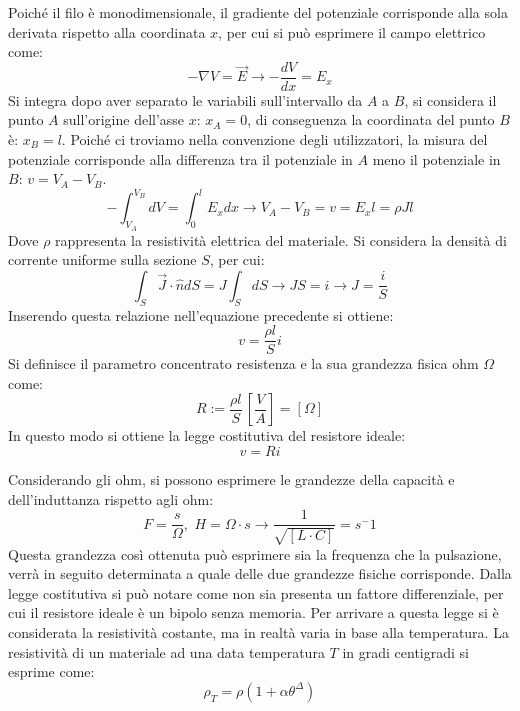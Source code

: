 \documentclass{article}
\numberwithin{equation}{subsection}
\begin{document}
Poiché il filo è monodimensionale, il gradiente del potenziale corrisponde alla sola derivata rispetto alla coordinata $x$, per cui si può esprimere il campo elettrico come:
\begin{equation*}
    -\nabla V=\vec{E}\to\displaystyle-\frac{dV}{dx}=E_x
\end{equation*}
Si integra dopo aver separato le variabili sull'intervallo da $A$ a $B$, si considera il punto $A$ sull'origine dell'asse $x$: $x_A=0$, di conseguenza la coordinata del punto 
$B$ è: $x_B=l$. Poiché ci troviamo nella convenzione degli utilizzatori, la misura del potenziale corrisponde alla differenza tra il potenziale in $A$ meno il potenziale in $B$:
$v=V_A-V_B$. 
\begin{equation*}
    \displaystyle-\int_{V_A}^{V_B}dV=\int_0^lE_xdx\to V_A-V_B=v=E_xl=\rho Jl
\end{equation*}
Dove $\rho$ rappresenta la resistività elettrica del materiale. Si considera la densità di corrente uniforme sulla sezione $S$, per cui:
\begin{equation*}
    \displaystyle\int_S\vec{J}\cdot\hat{n}dS=J\int_SdS\to JS=i\to J=\frac{i}{S}
\end{equation*}
Inserendo questa relazione nell'equazione precedente si ottiene:
\begin{equation*}
    v=\displaystyle\frac{\rho l}{S}i
\end{equation*}
Si definisce il parametro concentrato resistenza e la sua grandezza fisica ohm $\Omega$ come:
\begin{equation*}
    R:=\displaystyle\frac{\rho  l}{S}\,\left[\frac{V}{A}\right]=[\Omega]
\end{equation*}
In questo modo si ottiene la legge costitutiva del resistore ideale:
\begin{equation}
    v=Ri
\end{equation}

Considerando gli ohm, si possono esprimere le grandezze della capacità e dell'induttanza rispetto agli ohm:
\begin{equation*}
    F=\displaystyle\frac{s}{\Omega},\,\,H=\Omega\cdot s\to \frac{1}{\sqrt{[L\cdot C]}}=s^-1
\end{equation*}
Questa grandezza così ottenuta può esprimere sia la frequenza che la pulsazione, verrà in seguito determinata a quale delle due grandezze fisiche corrisponde. 
Dalla legge costitutiva si può notare come non sia presenta un fattore differenziale, per cui il resistore ideale è un bipolo senza memoria. Per arrivare a questa legge 
si è considerata la resistività costante, ma in realtà varia in base alla temperatura. La resistività di un materiale ad una data temperatura $T$ in gradi centigradi si esprime 
come:
\begin{equation*}
    \rho_T=\rho\left(1+\alpha\theta^\Delta\right)
\end{equation*}
\end{document}

